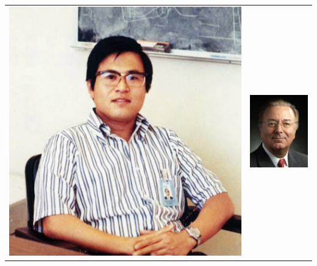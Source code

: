 \begin{frame}
\begin{columns}[c]
\begin{column}{.5\textwidth}
\begin{table}[h]
\begin{tabular}{cc}
					\includegraphics[width=0.4\linewidth]{images/shima.jpeg}
					& 		\includegraphics[width=0.35\linewidth]{images/faggin.jpg}
				\end{tabular}
			\end{table}
		\end{column}
	\end{columns}
\end{frame}

